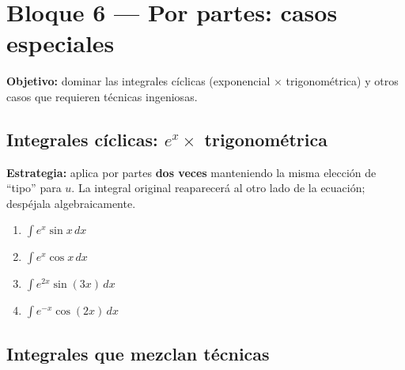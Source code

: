 \documentclass[12pt, letterpaper]{article}
\newcommand{\dx}{\,dx}
\begin{document}
\vspace{4pt}

\section{Bloque 6 — Por partes: casos especiales}

\begin{cuadroinfo}
\small\textbf{Objetivo:} dominar las integrales cíclicas
(exponencial $\times$ trigonométrica) y otros casos que requieren
técnicas ingeniosas.
\end{cuadroinfo}

\vspace{4pt}

\subsection{Integrales cíclicas: $e^x \times$ trigonométrica}

\begin{cuadroadvertencia}
\small\textbf{Estrategia:} aplica por partes \textbf{dos veces} manteniendo la misma
elección de ``tipo'' para $u$. La integral original reaparecerá al otro lado de la
ecuación; despéjala algebraicamente.
\end{cuadroadvertencia}

\begin{enumerate}[label=\textbf{\arabic*.}, leftmargin=*, itemsep=12pt, start=74]

  \item \medio\quad
    $\displaystyle\int e^x\sin x\dx$

  \item \medio\quad
    $\displaystyle\int e^x\cos x\dx$

  \item \dificil\quad
    $\displaystyle\int e^{2x}\sin(3x)\dx$

  \item \dificil\quad
    $\displaystyle\int e^{-x}\cos(2x)\dx$

\end{enumerate}

\subsection{Integrales que mezclan técnicas}
\end{document}
